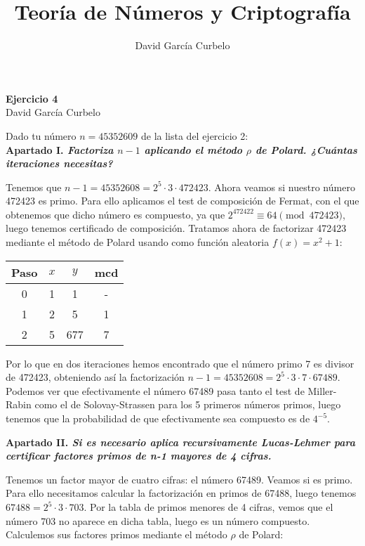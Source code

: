 \documentclass[fleqn]{article}
\author{David García Curbelo}
\title{Teoría de Números y Criptografía}
\begin{document}
    \begin{center}
        \LARGE{\textbf{Ejercicio 4}} \\
        \Large{David García Curbelo} \\
    \end{center}

    \vspace{1cm}
    
    Dado tu número $n = 45352609$ de la lista del ejercicio 2: \\ 


    \textbf{Apartado I. \textit{Factoriza $n-1$ aplicando el método $\rho$ de Polard. ¿Cuántas iteraciones necesitas?}} 

    Tenemos que $n-1 = 45352608 = 2^5 \cdot 3 \cdot 472423$. Ahora veamos si nuestro número 472423 es primo. Para ello
    aplicamos el test de composición de Fermat, con el que obtenemos que dicho número es compuesto, ya que
    $2^{472422} \equiv 64 \pmod{472423}$, luego tenemos certificado de composición. Tratamos ahora de factorizar 472423
    mediante el método de Polard usando como función aleatoria $f(x) = x^2 + 1$:

    \begin{center}
        \begin{tabular}{| c | c | c | c |}
            \hline Paso & $x$ & $y$ & mcd \\ \hline \hline
            0 & 1 & 1 & - \\ \hline
            1 & 2 & 5 & 1 \\ \hline 
            2 & 5 & 677 & 7 \\ \hline 
        \end{tabular}
    \end{center}

    Por lo que en dos iteraciones hemos encontrado que el número primo 7 es divisor de 472423, obteniendo así la factorización
    $n-1 = 45352608 = 2^5 \cdot 3 \cdot 7 \cdot 67489$. 
    Podemos ver que efectivamente el número 67489 pasa tanto el test de Miller-Rabin como el de Solovay-Strassen para
    los 5 primeros números primos, luego tenemos que la probabilidad de que efectivamente sea compuesto es de $4^{-5}$.



    \newpage
    \textbf{Apartado II. \textit{Si es necesario aplica recursivamente Lucas-Lehmer para certificar factores primos de n-1 mayores de 4 cifras.}}
   
    Tenemos un factor mayor de cuatro cifras: el número 67489. Veamos si es primo. Para ello necesitamos calcular la factorización en 
    primos de 67488, luego tenemos $67488 = 2^5 \cdot 3 \cdot 703$. Por la tabla de primos menores de 4 cifras, vemos que el número 703 no
    aparece en dicha tabla, luego es un número compuesto. Calculemos sus factores primos mediante el método $\rho$ de Polard:
\end{document}
